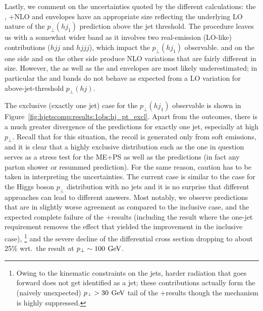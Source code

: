 Lastly, we comment on the uncertainties quoted by the different
calculations: the \hjetscompResbos, \hjetscompGoSam{}+\hjetscompSherpa NLO and \hjetscompMinlo envelopes
have an appropriate size reflecting the underlying LO nature of the
$p_\perp(hj_1)$ prediction above the jet threshold. The \hjetscompLoopsim
procedure leaves us with a somewhat wider band as it involves two
real-emission (LO-like) contributions ($hjj$ and $hjjj$), which impact
the $p_\perp(hj_1)$ observable.
\hjetscompMGaMC and \hjetscompSherpa \hjetscompMEPSatNLO on the one side and \hjetscompHerwig on the other
side produce NLO variations that are fairly different in size.
However, the \hjetscompHerwig as well as the \hjetscompPowheg and \hjetscompSherpa \hjetscompNNLOPS envelopes 
are most likely underestimated; in particular the \hjetscompPowheg and \hjetscompSherpa \hjetscompNNLOPS 
bands do not behave as
expected from a LO variation for above-jet-threshold $p_\perp(hj)$. 

The exclusive (exactly one jet) case for the $p_\perp(hj_1)$
observable is shown in Figure~\ref{fig:hjetscomp:results:1obs:hj_pt_excl}.
Apart from the \hjetscompNNLOPS outcomes, there is a much greater divergence of
the predictions for exactly one jet, especially at high $p_\perp$.
Recall that for this situation, the recoil is generated only from soft emissions, and
it is clear that a highly exclusive distribution such as the one in
question serves as a stress test for the ME+PS as well as the \hjetscompNNLOPS
predictions (in fact any parton shower or resummed prediction). For
the same reason, caution has to be taken in interpreting the 
uncertainties. The current case is similar to the case for the Higgs
boson $p_\perp$ distribution with no jets and it is no surprise that
different approaches can lead to different answers. Most notably, we
observe \hjetscompNNLOPS predictions that are in slightly worse agreement as
compared to the inclusive case, and the expected complete failure of the
\hjetscompGoSam{}+\hjetscompSherpa results (including the \hjetscompLoopsim result where the
one-jet requirement removes the effect that yielded the
improvement in the inclusive case),%
\footnote{Owing to the kinematic constraints on the jets, harder
  radiation that goes forward does not get identified as a jet;
  these contributions actually form the (naively unexpected)
  $p_\perp>30\,\text{\:GeV}$ tail of the \hjetscompGoSam{}+\hjetscompSherpa results though the
  mechanism is highly suppressed.}
and the severe decline of the \hjetscompHerwig differential cross section
dropping to about 25\% wrt.~the \hjetscompPowheg result at $p_\perp\sim100\,\text{\:GeV}$.



